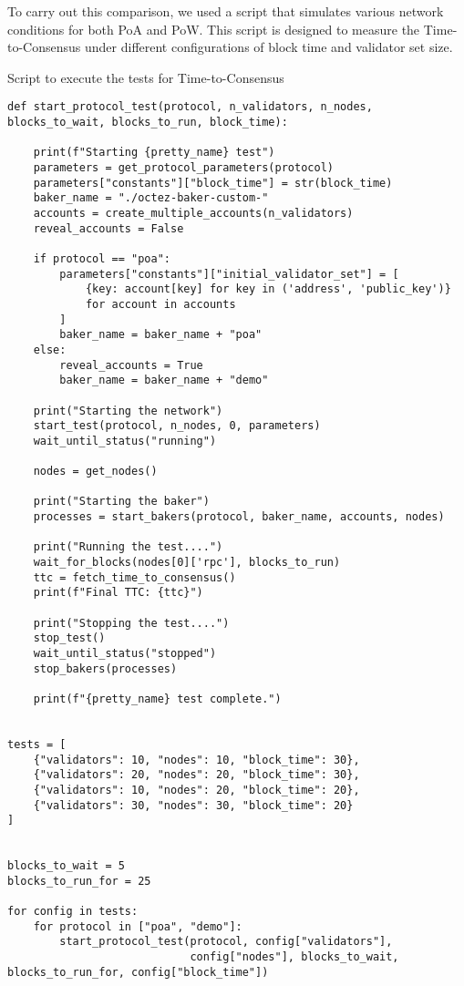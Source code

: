 To carry out this comparison, we used a script that simulates various network conditions for both PoA and PoW. This script is designed to measure the Time-to-Consensus under different configurations of block time and validator set size.


\begin{listing}[H]
\caption{Script to execute the tests for Time-to-Consensus}
\label{lst:python_code}
\begin{verbatim}
def start_protocol_test(protocol, n_validators, n_nodes, blocks_to_wait, blocks_to_run, block_time):

    print(f"Starting {pretty_name} test")
    parameters = get_protocol_parameters(protocol)
    parameters["constants"]["block_time"] = str(block_time)
    baker_name = "./octez-baker-custom-"
    accounts = create_multiple_accounts(n_validators)
    reveal_accounts = False

    if protocol == "poa":
        parameters["constants"]["initial_validator_set"] = [
            {key: account[key] for key in ('address', 'public_key')}
            for account in accounts
        ]
        baker_name = baker_name + "poa"
    else:
        reveal_accounts = True
        baker_name = baker_name + "demo"

    print("Starting the network")
    start_test(protocol, n_nodes, 0, parameters)
    wait_until_status("running")

    nodes = get_nodes()

    print("Starting the baker")
    processes = start_bakers(protocol, baker_name, accounts, nodes)

    print("Running the test....")
    wait_for_blocks(nodes[0]['rpc'], blocks_to_run)
    ttc = fetch_time_to_consensus()
    print(f"Final TTC: {ttc}")

    print("Stopping the test....")
    stop_test()
    wait_until_status("stopped")
    stop_bakers(processes)

    print(f"{pretty_name} test complete.")


tests = [
    {"validators": 10, "nodes": 10, "block_time": 30},
    {"validators": 20, "nodes": 20, "block_time": 30},
    {"validators": 10, "nodes": 20, "block_time": 20},
    {"validators": 30, "nodes": 30, "block_time": 20}
]


blocks_to_wait = 5
blocks_to_run_for = 25

for config in tests:
    for protocol in ["poa", "demo"]:
        start_protocol_test(protocol, config["validators"],
                            config["nodes"], blocks_to_wait, blocks_to_run_for, config["block_time"])
\end{verbatim}
\end{listing}


